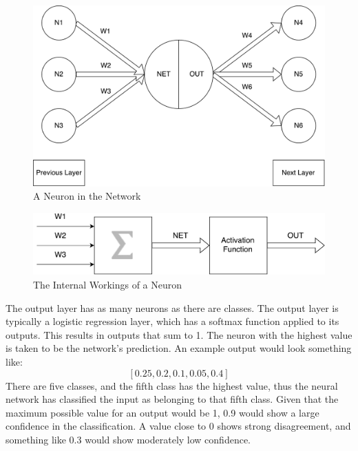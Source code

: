  \begin{figure}[!h]
 	
 	\centering
 	\includegraphics[width=\textwidth]{figures/multilayer_perceptron_neuron}
 	\centering
 	\caption{A Neuron in the Network}
 	\label{fig:multi_neuron}
 \end{figure}

\begin{figure}[!h]
	
	\centering
	\includegraphics[width=\textwidth]{figures/multilayer_perceptron_neuron2}
	\centering
	\caption{The Internal Workings of a Neuron}
	\label{fig:multi_neuron_close}
\end{figure}
 
 
 The output layer has as many neurons as there are classes. The output layer is typically a logistic regression layer, which has a softmax function applied to its outputs. This results in outputs that sum to 1. The neuron with the highest value is taken to be the network's prediction. An example output would look something like:
 \[ [0.25, 0.2, 0.1, 0.05, 0.4] \] There are five classes, and the fifth class has the highest value, thus the neural network has classified the input as belonging to that fifth class. Given that the maximum possible value for an output would be 1, 0.9 would show a large confidence in the classification. A value close to 0 shows strong disagreement, and something like 0.3 would show moderately low confidence.
 
